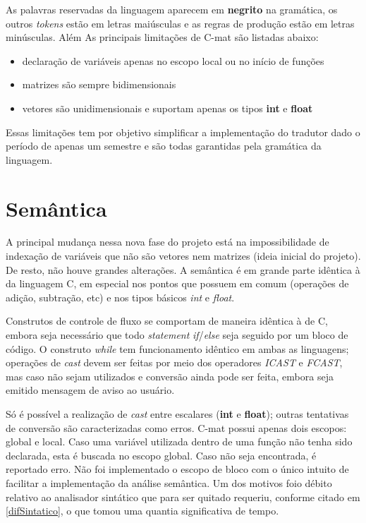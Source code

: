 \documentclass[
	article,			%
	11pt,				%
	oneside,			%
	a4paper,			%
	english,			%
	brazil,				%
	sumario=tradicional
	]{abntex2}
\renewcommand{\it}[1]{\textit{#1}}
\renewcommand{\bf}[1]{\textbf{#1}}
\begin{document}
As palavras reservadas da linguagem aparecem em \bf{negrito} na gramática, os outros \it{tokens} estão em letras maiúsculas e as regras de produção estão em letras minúsculas. Além As principais limitações de C-mat são listadas abaixo:
\begin{itemize}
	\item declaração de variáveis apenas no escopo local ou no início de funções
	\item matrizes são sempre bidimensionais
	\item vetores são unidimensionais e suportam apenas os tipos \bf{int} e \bf{float}
\end{itemize}
Essas limitações tem por objetivo simplificar a implementação do tradutor dado o período de apenas um semestre e são todas garantidas pela gramática da linguagem.






\section{Semântica}
A principal mudança nessa nova fase do projeto está na impossibilidade de indexação de variáveis que não são vetores nem matrizes (ideia inicial do projeto). De resto, não houve grandes alterações. A semântica é em grande parte idêntica à da linguagem C, em especial nos pontos que possuem em comum (operações de adição, subtração, etc) e nos tipos básicos \it{int} e \it{float}. 

Construtos de controle de fluxo se comportam de maneira idêntica à de C, embora seja necessário que todo \it{statement} \it{if}/\it{else} seja seguido por um bloco de código. O construto \it{while} tem funcionamento idêntico em ambas as linguagens; operações de \it{cast} devem ser feitas por meio dos operadores \it{ICAST} e \it{FCAST}, mas caso não sejam utilizados e conversão ainda pode ser feita, embora seja emitido mensagem de aviso ao usuário.

Só é possível a realização de \it{cast} entre escalares (\bf{int} e \bf{float}); outras tentativas de conversão são caracterizadas como erros. C-mat possui apenas dois escopos: global e local. Caso uma variável utilizada dentro de uma função não tenha sido declarada, esta é buscada no escopo global. Caso não seja encontrada, é reportado erro. Não foi implementado o escopo de bloco com o
único intuito de facilitar a implementação da análise semântica. Um dos motivos foio débito relativo ao analisador sintático que para ser quitado requeriu, conforme citado em \ref{difSintatico}, o que tomou uma quantia significativa de tempo.
\end{document}
